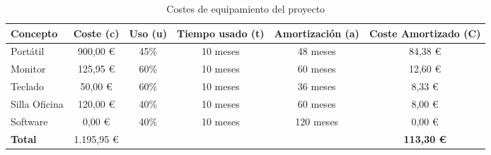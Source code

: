 \begin{table}[htbp]
    \begin{adjustbox}{max width=\textwidth}
    \centering
    \caption{Costes de equipamiento del proyecto}
    \label{tab:costes_equipamiento}
    \begin{tabular}{@{}lccccc@{}}
    \toprule
    \textbf{Concepto} & \multicolumn{1}{l}{\textbf{Coste (c)}} & \multicolumn{1}{l}{\textbf{Uso (u)}} & \multicolumn{1}{l}{\textbf{Tiempo usado (t)}} & \multicolumn{1}{l}{\textbf{Amortización (a)}} & \multicolumn{1}{l}{\textbf{Coste Amortizado (C)}} \\ \midrule
    Portátil          & 900,00 \euro                                & 45\%                                 & 10 meses                                      & 48 meses                                      & 84,38 \euro                                            \\
    Monitor           & 125,95 \euro                                & 60\%                                 & 10 meses                                      & 60 meses                                      & 12,60 \euro                                            \\
    Teclado           & 50,00 \euro                                 & 60\%                                 & 10 meses                                      & 36 meses                                      & 8,33 \euro                                             \\
    Silla Oficina     & 120,00 \euro                                & 40\%                                 & 10 meses                                      & 60 meses                                      & 8,00 \euro                                             \\
    Software          & 0,00 \euro                                  & 40\%                                 & 10 meses                                      & 120 meses                                     & 0,00 \euro                                             \\ \midrule
    \textbf{Total}    & 1.195,95 \euro                              &                                      &                                               &                                               & \textbf{113,30 \euro}                                  \\ \bottomrule
    \end{tabular}
    \end{adjustbox}
\end{table}


